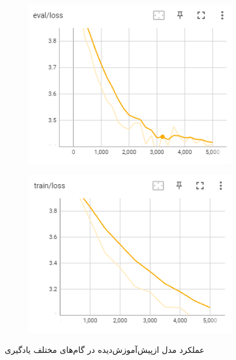 \documentclass[12pt, a4paper]{book}
\begin{document}
\begin{figure}[h]
    \centering
    \begin{subfigure}{0.45\linewidth}
        \centering
        \includegraphics[width=\linewidth]{image/part2/tb/3.png}
    \end{subfigure}
    \hfil
    \begin{subfigure}{0.45\linewidth}
        \centering
        \includegraphics[width=\linewidth]{image/part2/tb/6.png}
    \end{subfigure}
    \caption{عملکرد مدل ازپیش‌آموزش‌دیده  در گام‌های مختلف یادگیری}
    \label{part2_training}
\end{figure}
\end{document}
